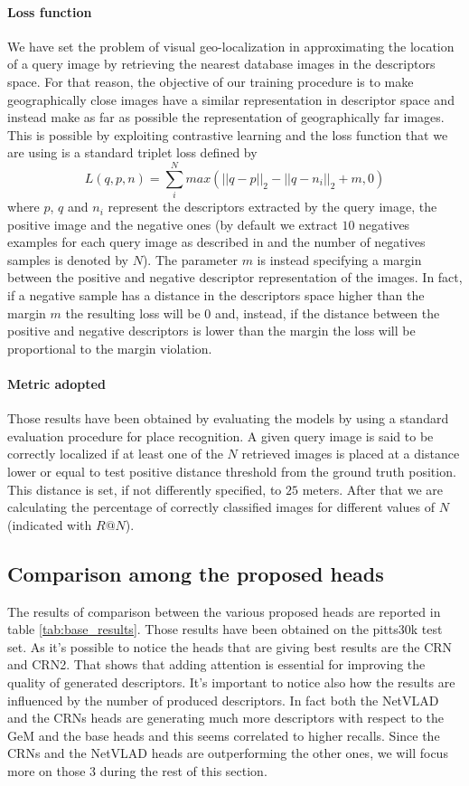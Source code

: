\documentclass[10pt,twocolumn,letterpaper]{article}
\begin{document}
\paragraph{Loss function}
We have set the problem of visual geo-localization in approximating the location of a query image by retrieving the nearest 
database images in the descriptors space. For that reason, the objective of our training procedure is to make geographically
close images have a similar representation in descriptor space and instead make as far as possible the representation of geographically far images.
This is possible by exploiting contrastive learning and the loss function that we are using is a standard triplet loss defined by
\begin{equation}
   L(q, p, n) = \sum_i^N max( {|| q - p ||}_2 - {|| q - n_i||}_2 + m, 0)
\end{equation}
where $p$, $q$ and $n_i$ represent the descriptors extracted by the query image, the positive image and the negative ones (by default we extract
$10$ negatives examples for each query image as described in  and the number of negatives samples is denoted by $N$).
The parameter $m$ is instead specifying a margin between the positive and negative descriptor representation of the images.
In fact, if a negative sample has a distance in the descriptors space higher than the margin $m$ the resulting loss will be $0$ and, instead,
if the distance between the positive and negative descriptors is lower than the margin the loss will be proportional to the margin violation.

\paragraph{Metric adopted}
Those results have been obtained by evaluating the models by using a standard evaluation procedure for place recognition.
A given query image is said to be correctly localized if at least one of the $N$ retrieved images is placed at a distance lower
or equal to test positive distance threshold from the ground truth position. This distance is set, if not differently specified, to $25$ meters. After
that we are calculating the percentage of correctly classified images for different values of $N$ (indicated with $R@N$).  

\subsection{Comparison among the proposed heads}
The results of comparison between the various proposed heads are reported in table \ref{tab:base_results}. Those results have 
been obtained on the pitts30k test set. As it's possible to notice the heads that are giving best results are the CRN and CRN2. That 
shows that adding attention is essential for improving the quality of generated descriptors. It's important to notice also how 
the results are influenced by the number of produced descriptors. In fact both the NetVLAD and the CRNs heads are generating much 
more descriptors with respect to the GeM and the base heads and this seems correlated to higher recalls. Since the CRNs and the NetVLAD
heads are outperforming the other ones, we will focus more on those 3 during the rest of this section.
\end{document}
